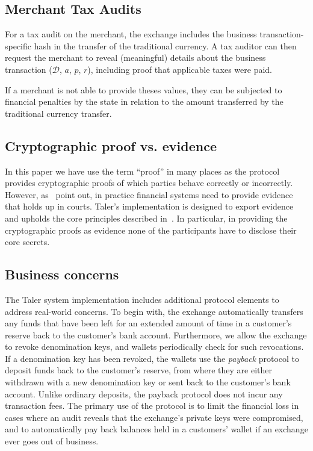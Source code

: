 \documentclass[sigconf, authordraft]{acmart}
\begin{document}
\subsection{Merchant Tax Audits}

For a tax audit on the merchant, the exchange includes the business
transaction-specific hash in the transfer of the traditional
currency.  A tax auditor can then request the merchant to reveal
(meaningful) details about the business transaction ($\mathcal{D}$,
$a$, $p$, $r$), including proof that applicable taxes were paid.

If a merchant is not able to provide theses values, they can be
subjected to financial penalties by the state in relation to the
amount transferred by the traditional currency transfer.

\subsection{Cryptographic proof vs. evidence}

In this paper we have use the term ``proof'' in many places as the
protocol provides cryptographic proofs of which parties behave
correctly or incorrectly. However, as~\cite{fc2014murdoch} point out,
in practice financial systems need to provide evidence that holds up
in courts.  Taler's implementation is designed to export evidence and
upholds the core principles described in~\cite{fc2014murdoch}.  In
particular, in providing the cryptographic proofs as evidence none of
the participants have to disclose their core secrets.

\subsection{Business concerns}

The Taler system implementation includes additional protocol elements
to address real-world concerns.  To begin with, the exchange
automatically transfers any funds that have been left for an extended
amount of time in a customer's reserve back to the customer's bank
account.  Furthermore, we allow the exchange to revoke denomination
keys, and wallets periodically check for such revocations.  If a
denomination key has been revoked, the wallets use the {\em payback}
protocol to deposit funds back to the customer's reserve, from where
they are either withdrawn with a new denomination key or sent back to
the customer's bank account.  Unlike ordinary deposits, the payback
protocol does not incur any transaction fees. The primary use of the
protocol is to limit the financial loss in cases where an audit
reveals that the exchange's private keys were compromised, and to
automatically pay back balances held in a customers' wallet if an
exchange ever goes out of business.
\end{document}
